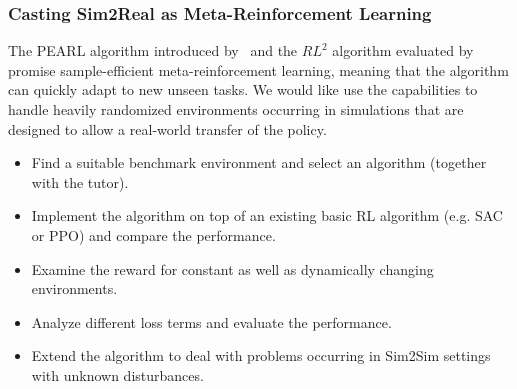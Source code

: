 \documentclass[a4paper]{article}
\begin{document}
\subsubsection{Casting Sim2Real as Meta-Reinforcement Learning}
The PEARL algorithm introduced by~\citet{rakelly2019} and the $RL^2$ algorithm evaluated by \citet{Yu2017} promise sample-efficient meta-reinforcement learning, meaning that the algorithm can quickly adapt to new unseen tasks. We would like use the capabilities to handle heavily randomized environments occurring in simulations that are designed to allow a real-world transfer of the policy.
\begin{itemize}
  \item Find a suitable benchmark environment and select an algorithm (together with the tutor).
  \item Implement the algorithm on top of an existing basic RL algorithm (e.g. SAC or PPO) and compare the performance.
  \item Examine the reward for constant as well as dynamically changing environments.
  \item Analyze different loss terms and evaluate the performance.
  \item Extend the algorithm to deal with problems occurring in Sim2Sim settings with unknown disturbances.
\end{itemize}



\end{document}
